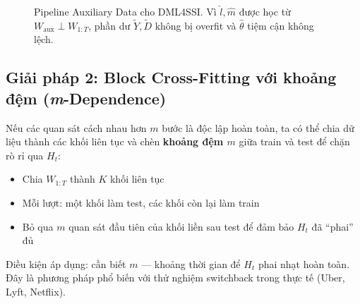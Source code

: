 \begin{figure}[H]
\caption{Pipeline Auxiliary Data cho DML4SSI. Vì \(\hat{l}, \hat{m}\) được học từ \(W_{\text{aux}} \perp W_{1:T}\), phần dư \(\tilde{Y}, \tilde{D}\) không bị overfit và \(\hat{\theta}\) tiệm cận không lệch.}
\label{fig:aux-pipeline}
\end{figure}

\subsection{Giải pháp 2: Block Cross-Fitting với khoảng đệm (\textit{m}-Dependence)}

Nếu các quan sát cách nhau hơn \(m\) bước là độc lập hoàn toàn, ta có thể chia dữ liệu thành các khối liên tục và chèn \textbf{khoảng đệm \(m\)} giữa train và test để chặn rò rỉ qua \(H_t\):

\begin{itemize}
    \item Chia \(W_{1:T}\) thành \(K\) khối liên tục
    \item Mỗi lượt: một khối làm test, các khối còn lại làm train
    \item Bỏ qua \(m\) quan sát đầu tiên của khối liền sau test để đảm bảo \(H_t\) đã ``phai'' đủ
\end{itemize}

Điều kiện áp dụng: cần biết \(m\) --- khoảng thời gian để \(H_t\) phai nhạt hoàn toàn. Đây là phương pháp phổ biến với thử nghiệm switchback trong thực tế (Uber, Lyft, Netflix).

